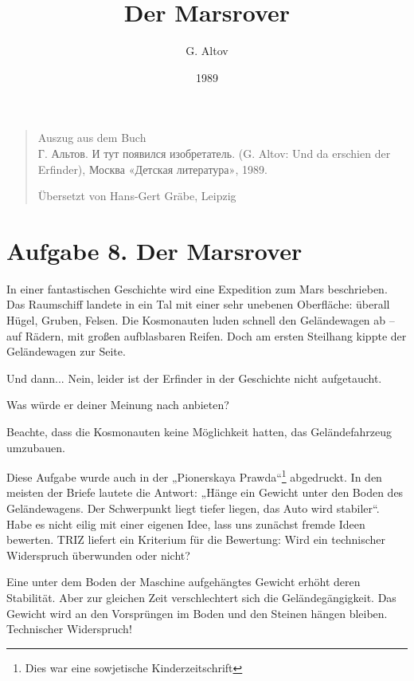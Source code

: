 \documentclass[11pt,a4paper]{article}
\title{Der Marsrover}
\author{G. Altov}
\date{1989}
\begin{document}
\maketitle

\begin{quote}
  Auszug aus dem Buch\\ \foreignlanguage{russian}{Г. Альтов.  И тут появился
    изобретатель.}  (G. Altov: Und da erschien der Erfinder),
  \foreignlanguage{russian}{Москва «Детская литература»}, 1989.

  Übersetzt von Hans-Gert Gräbe, Leipzig
\end{quote}

\section*{Aufgabe 8. Der Marsrover}

In einer fantastischen Geschichte wird eine Expedition zum Mars beschrieben.
Das Raumschiff landete in ein Tal mit einer sehr unebenen Oberfläche: überall
Hügel, Gruben, Felsen. Die Kosmonauten luden schnell den Geländewagen ab --
auf Rädern, mit großen aufblasbaren Reifen. Doch am ersten Steilhang kippte
der Geländewagen zur Seite.

Und dann... Nein, leider ist der Erfinder in der Geschichte nicht aufgetaucht.

Was würde er deiner Meinung nach anbieten?

Beachte, dass die Kosmonauten keine Möglichkeit hatten, das Geländefahrzeug
umzubauen.

Diese Aufgabe wurde auch in der „Pionerskaya Prawda“\footnote{Dies war eine
  sowjetische Kinderzeitschrift} abgedruckt. In den meisten der Briefe lautete
die Antwort: „Hänge ein Gewicht unter den Boden des Geländewagens. Der
Schwerpunkt liegt tiefer liegen, das Auto wird stabiler“. Habe es nicht eilig
mit einer eigenen Idee, lass uns zunächst fremde Ideen bewerten. TRIZ liefert
ein Kriterium für die Bewertung: Wird ein technischer Widerspruch überwunden
oder nicht?

Eine unter dem Boden der Maschine aufgehängtes Gewicht erhöht deren
Stabilität.  Aber zur gleichen Zeit verschlechtert sich die Geländegängigkeit.
Das Gewicht wird an den Vorsprüngen im Boden und den Steinen hängen bleiben.
Technischer Widerspruch!
\end{document}

